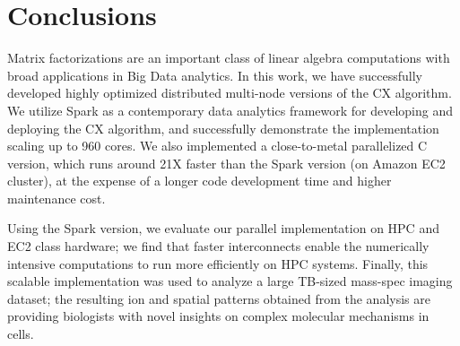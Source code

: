\section{Conclusions}
\label{sec:conclusion}

Matrix factorizations are an important class of linear algebra computations
with broad applications in Big Data analytics. In this work, we have
successfully developed highly optimized distributed multi-node
versions of the CX algorithm.
We utilize
Spark as a contemporary data analytics framework for developing and deploying
the CX algorithm, and successfully demonstrate the implementation scaling up to
960 cores. 
We also implemented a close-to-metal parallelized C version, which runs around 21X
faster than the Spark version (on Amazon EC2 cluster), at the expense of a longer code development
time and higher maintenance cost.

Using the Spark version, we evaluate our parallel implementation on HPC and EC2 class
hardware; we find that faster interconnects enable the numerically intensive
computations to run more efficiently on HPC systems. Finally, this scalable
implementation was used to analyze a large TB-sized mass-spec imaging
dataset; the resulting ion and spatial patterns obtained from the analysis are
providing biologists with novel insights on complex molecular mechanisms in
cells. 

